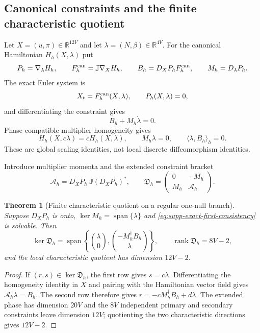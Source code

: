 \documentclass[11pt]{article}
\newtheorem{theorem}{Theorem}[section]
\numberwithin{equation}{section}
\theoremstyle{definition}
\theoremstyle{remark}
\newcommand{\rank}{\operatorname{rank}}
\begin{document}
\subsection{Canonical constraints and the finite characteristic quotient}

Let $X=(u,\pi)\in\mathbb R^{12V}$ and let
$\lambda=(N,\beta)\in\mathbb R^{4V}$.  For the canonical Hamiltonian
$H_h(X,\lambda)$ put
\begin{equation}
 P_h=\nabla_\lambda H_h,\qquad
 F_h^{\rm can}=\mathbb J\nabla_XH_h,\qquad
 B_h=D_XP_hF_h^{\rm can},\qquad M_h=D_\lambda P_h.
 \label{eq:supp-exact-canonical-objects}
\end{equation}
The exact Euler system is
\begin{equation}
 X_t=F_h^{\rm can}(X,\lambda),\qquad P_h(X,\lambda)=0,
 \label{eq:supp-exact-euler}
\end{equation}
and differentiating the constraint gives
\begin{equation}
 B_h+M_h\dot\lambda=0.
 \label{eq:supp-exact-first-consistency}
\end{equation}
Phase-compatible multiplier homogeneity gives
\begin{equation}
 H_h(X,c\lambda)=cH_h(X,\lambda),\qquad
 M_h\lambda=0,
 \qquad \langle\lambda,B_h\rangle_h=0.
 \label{eq:supp-exact-homogeneity}
\end{equation}
These are global scaling identities, not local discrete diffeomorphism
identities.

Introduce multiplier momenta and the extended constraint bracket
\begin{equation}
 \mathcal A_h=D_XP_h\,\mathbb J(D_XP_h)^*,\qquad
 \mathfrak D_h=\begin{pmatrix}0&-M_h\\M_h&\mathcal A_h\end{pmatrix}.
 \label{eq:supp-exact-dirac-matrix}
\end{equation}

\begin{theorem}[Finite characteristic quotient on a regular one-null branch]
\label{thm:supp-exact-constraint-rank}
Suppose $D_XP_h$ is onto, $\ker M_h=\operatorname{span}\{\lambda\}$ and
\eqref{eq:supp-exact-first-consistency} is solvable.  Then
\begin{equation}
 \ker\mathfrak D_h=\operatorname{span}\left\{
 \binom{\lambda}{0},\binom{-M_h^\dagger B_h}{\lambda}\right\},
 \qquad \rank\mathfrak D_h=8V-2,
 \label{eq:supp-exact-dirac-rank}
\end{equation}
and the local characteristic quotient has dimension $12V-2$.
\end{theorem}
\begin{proof}
If $(r,s)\in\ker\mathfrak D_h$, the first row gives $s=c\lambda$.
Differentiating the homogeneity identity in $X$ and pairing with the
Hamiltonian vector field gives $\mathcal A_h\lambda=B_h$.  The second row
therefore gives $r=-cM_h^\dagger B_h+d\lambda$.  The extended phase has
dimension $20V$ and the $8V$ independent primary and secondary constraints
leave dimension $12V$; quotienting the two characteristic directions gives
$12V-2$.
\end{proof}
\end{document}
